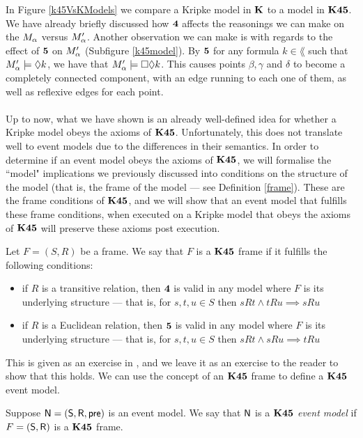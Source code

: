 In Figure \ref{k45VsKModels} we compare a Kripke model in $\bf K$ to a model in $\bf K45$.
We have already briefly discussed how $\bf 4$ affects the reasonings we can make on the $M_\alpha$ versus
$M'_\alpha$.
Another observation we can make is with regards to the effect of $\bf 5$ on $M'_\alpha$ (Subfigure
\ref{k45model}).
By $\bf 5$ for any formula $k \in \lang$ such that $M'_\alpha \models
\Diamond k$, we have that $M'_\alpha \models \Box \Diamond k$.
This causes points $\beta, \gamma$ and $\delta$ to become a completely connected component,
with an edge running to each one of them, as well as reflexive edges for each point.\\
\\
Up to now, what we have shown is an already well-defined idea for whether a Kripke model obeys the axioms of $\bf K45$.
Unfortunately, this does not translate well to event models due to the differences in their
semantics.
In order to determine if an event model obeys the axioms of $\bf K45$, we will formalise the ``model"
implications we previously discussed into conditions on the structure of the model (that is, the
frame of the model --- see Definition \ref{frame}).
These are the frame conditions of $\bf K45$, and we will show that an event model that fulfills these
frame conditions, when executed on a Kripke model that obeys the axioms of $\bf K45$ will preserve
these axioms post execution.

\begin{lemma} \label{lemma:k45frameconditions}
	Let $F = (S,R)$ be a frame.
	We say that $F$ is a $\bf K45$ frame if it fulfills the following conditions:
	\begin{itemize}
		\item if $R$ is a transitive relation, then $\bf 4$ is valid in any model where $F$ is its
			underlying structure --- that is, for $s, t, u \in S$ then $s R t \land t R u \implies s R u$
		\item if $R$ is a Euclidean relation, then $\bf 5$ is valid in any model where $F$ is its
			underlying structure --- that is, for $s, t, u \in S$ then $s R t \land s R u \implies t R u$
	\end{itemize}
\end{lemma}

This is given as an exercise in \cite{fagin1995reasoning}, and we leave it as an exercise to the
reader to show that this holds.
We can use the concept of an $\bf K45$ frame to define a $\bf K45$ event model.

\begin{defn} \label{defn:k45eventModel}
	Suppose $\mathrm{\mathsf{N}} = (\mathrm{\mathsf{S}}, \mathrm{\mathsf{R}}, \mathrm{\mathsf{pre}})$ is an event model.
	We say that $\mathrm{\mathsf{N}}$ is a {\em $\bf K45$ event model} if $F = (\mathrm{\mathsf{S}}, \mathrm{\mathsf{R}})$ is a $\bf K45$ frame.
\end{defn}

